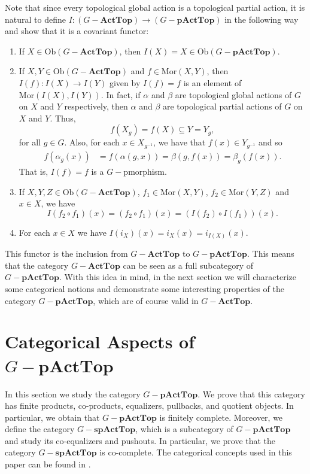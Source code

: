 \documentclass[sn-mathphys-num]{sn-jnl}%
\theoremstyle{thmstyleone}%
\theoremstyle{thmstyletwo}%
\theoremstyle{thmstylethree}%
\begin{document}
Note that since every topological global action is a topological partial action, it is natural to define $I:(G-\mathbf{ActTop}) \to(G-\mathbf{pActTop}) $ in the following way and show that it is a covariant functor:
\begin{enumerate}
\item If $ X \in \text{Ob} (G-\mathbf{ActTop}) $, then $ I (X) = X \in \text{Ob}(G-\mathbf{pActTop}) $.
\item If $ X, Y \in \text{Ob} (G-\mathbf{ActTop}) $ and $ f \in \text{Mor} (X, Y) $, then $ I (f ): I (X) \to I (Y) $ given by $ I (f) = f $ is an element of $ \text{Mor} (I (X), I (Y)) $. In fact, if $ \alpha $ and $ \beta $ are topological global actions of $ G $ on $ X $ and $ Y $ respectively, then $ \alpha $ and $ \beta $ are topological partial actions of $ G $ on $ X $ and $ Y $. Thus, $$ f (X_g) = f (X) \subseteq Y = Y_g,$$
for all $g\in G$. Also, for each $ x \in X_{g^{-1}}$, we have that $ f (x) \in Y_{g^{-1}} $ and so
      \begin{align*}
      f (\alpha_g (x)) &= f (\alpha (g, x)) = \beta (g, f (x)) = \beta_g (f (x)).
      \end{align*}
      That is, $ I (f) = f $ is a $G-$pmorphism.
  \item If $ X, Y, Z \in \text{Ob} (G-\mathbf{ActTop}) $, $ f_1 \in \text {Mor} (X, Y) $, $ f_2 \in \text {Mor} (Y, Z) $ and $ x \in X $,
   we have
  $$ I (f_2 \circ f_1) (x) = (f_2 \circ f_1) (x) = (I (f_2) \circ I (f_1)) (x).$$
  \item For each $ x \in X $ we have $ I (i_{X}) (x) = i_{X} (x) = i_{I (X)} (x) $.
\end{enumerate}
This functor is the inclusion from $G-\mathbf{ActTop}$ to $G-\mathbf{pActTop}$. This means that the category  $G-\mathbf{ActTop}$ can be seen as a full subcategory of $G-\mathbf{pActTop}$. With this idea in mind, in the next section we will characterize some categorical notions and demonstrate some interesting properties of the category $G-\mathbf{pActTop}$, which are of course valid in $G-\mathbf{ActTop}$.

\section{Categorical Aspects of $G-\mathbf{pActTop}$}

In this section we study the category $G-\mathbf{pActTop}$. We prove that this category has finite products, co-products, equalizers, pullbacks, and quotient objects. In particular, we obtain  that $G-\mathbf{pActTop}$ is finitely complete. Moreover, we define the category $G-\mathbf{spActTop}$, which is a subcategory of $G-\mathbf{pActTop}$ and study its co-equalizers and pushouts. In particular, we prove that the category $G-\mathbf{spActTop}$ is co-complete. The categorical concepts used in this paper can be found in \cite{Adamek,MacLane}.
\end{document}
